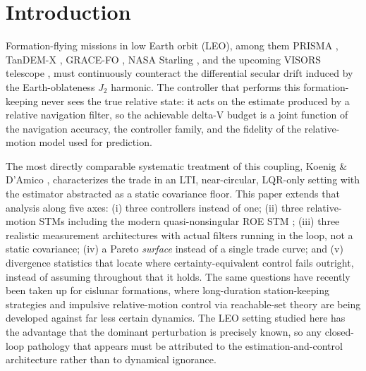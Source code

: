 \section{Introduction}\label{sec:intro}

Formation-flying missions in low Earth orbit (LEO), among them PRISMA
\cite{damico2012prisma}, TanDEM-X \cite{montenbruck2008tandemx}, GRACE-FO
\cite{kornfeld2019gracefo}, NASA Starling \cite{kruger2025starling}, and the
upcoming VISORS telescope \cite{guffanti2023visors}, must continuously
counteract the differential secular drift induced by the Earth-oblateness
$J_2$ harmonic. The controller that performs this formation-keeping never
sees the true relative state: it acts on the estimate produced by a relative
navigation filter, so the achievable delta-V budget is a joint function of
the navigation accuracy, the controller family, and the fidelity of the
relative-motion model used for prediction.

The most directly comparable systematic treatment of this coupling,
Koenig \& D'Amico \cite{koenig2018tradeoffs}, characterizes the trade in an
LTI, near-circular, LQR-only setting with the estimator abstracted as a
static covariance floor. This paper extends that analysis along five axes:
(i) three controllers instead of one; (ii) three relative-motion STMs
including the modern quasi-nonsingular ROE STM \cite{koenig2017stm};
(iii) three realistic measurement architectures with actual filters running
in the loop, not a static covariance; (iv) a Pareto \emph{surface} instead
of a single trade curve; and (v) divergence statistics that locate where
certainty-equivalent control fails outright, instead of assuming throughout
that it holds. The same questions have recently been taken up for cislunar
formations, where long-duration station-keeping strategies
\cite{foss2025stationkeeping} and impulsive relative-motion control via
reachable-set theory \cite{hunter2025cislunar} are being developed against
far less certain dynamics. The LEO setting studied here has the advantage
that the dominant perturbation is precisely known, so any closed-loop
pathology that appears must be attributed to the estimation-and-control
architecture rather than to dynamical ignorance.

